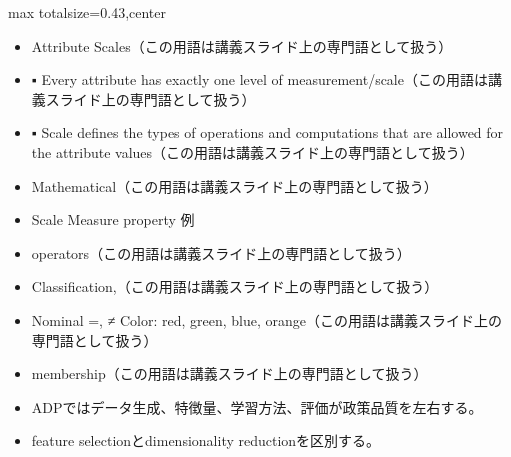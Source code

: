 \clearpage
{}
\begin{minipage}[t]{0.405\textwidth}
\begin{adjustbox}{max totalsize={\textwidth}{0.43\textheight},center}
\begin{minipage}{\textwidth}\scriptsize
{}\begin{itemize}
\item Attribute Scales（この用語は講義スライド上の専門語として扱う）
\item ▪ Every attribute has exactly one level of measurement/scale（この用語は講義スライド上の専門語として扱う）
\item ▪ Scale defines the types of operations and computations that are allowed for the attribute values（この用語は講義スライド上の専門語として扱う）
\item Mathematical（この用語は講義スライド上の専門語として扱う）
\item Scale Measure property 例
\item operators（この用語は講義スライド上の専門語として扱う）
\item Classification,（この用語は講義スライド上の専門語として扱う）
\item Nominal =, ≠ Color: red, green, blue, orange（この用語は講義スライド上の専門語として扱う）
\item membership（この用語は講義スライド上の専門語として扱う）
\end{itemize}\begin{itemize}
\item ADPではデータ生成、特徴量、学習方法、評価が政策品質を左右する。
\item feature selectionとdimensionality reductionを区別する。
\end{itemize}
\end{minipage}
\end{adjustbox}
\end{minipage}\hfill
